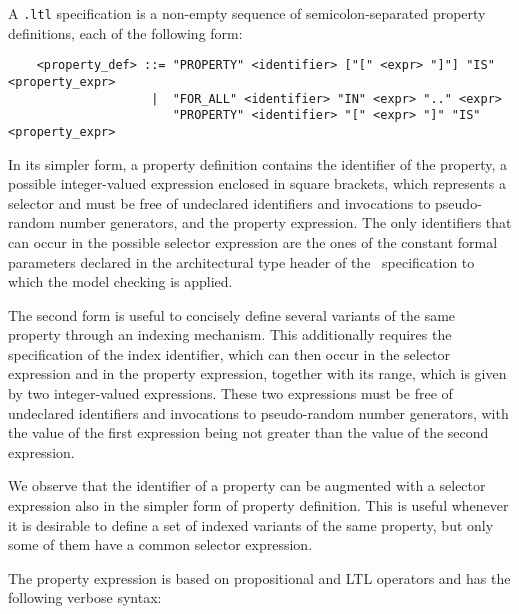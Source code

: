 A {\tt .ltl} specification is a non-empty sequence of semicolon-separated property definitions, each of the
following form:

        \begin{verbatim}
    <property_def> ::= "PROPERTY" <identifier> ["[" <expr> "]"] "IS" <property_expr>
                    |  "FOR_ALL" <identifier> "IN" <expr> ".." <expr>
                       "PROPERTY" <identifier> "[" <expr> "]" "IS" <property_expr>
        \end{verbatim}

In its simpler form, a property definition contains the identifier of the property, a possible
integer-valued expression enclosed in square brackets, which represents a selector and must be free of
undeclared identifiers and invocations to pseudo-random number generators, and the property expression. The
only identifiers that can occur in the possible selector expression are the ones of the constant formal
parameters declared in the architectural type header of the \aemilia\ specification to which the model
checking is applied.

The second form is useful to concisely define several variants of the same property through an indexing
mechanism. This additionally requires the specification of the index identifier, which can then occur in the
selector expression and in the property expression, together with its range, which is given by two
integer-valued expressions. These two expressions must be free of undeclared identifiers and invocations to
pseudo-random number generators, with the value of the first expression being not greater than the value of
the second expression.

We observe that the identifier of a property can be augmented with a selector expression also in the simpler
form of property definition. This is useful whenever it is desirable to define a set of indexed variants of
the same property, but only some of them have a common selector expression.

The property expression is based on propositional and LTL operators and has the following verbose syntax:

